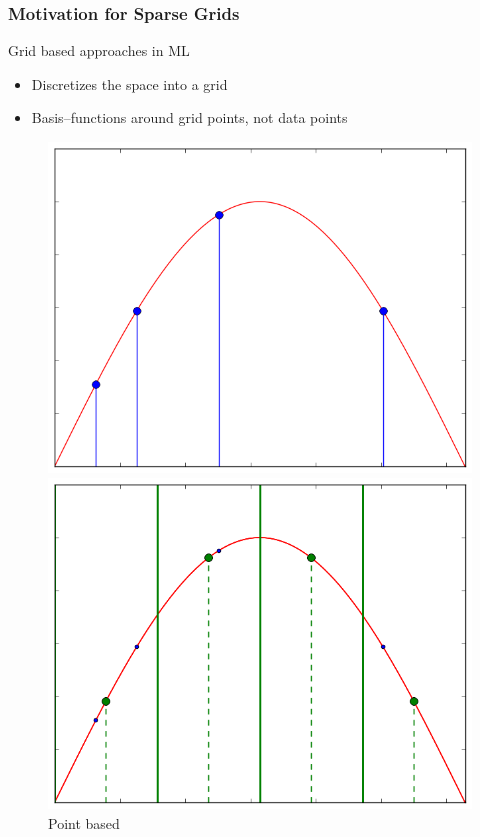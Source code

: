 \begin{frame}
  \frametitle{Motivation for Sparse Grids}
  \topline
  \vspace{-10px}
  \begin{block}{Grid based approaches in ML}
    \begin{itemize}
      \item Discretizes the space into a grid
      \item Basis--functions around grid points, not data points
    \end{itemize}

    \begin{figure}[!htb]
      \includegraphics[width=\linewidth]{images/pointbase.png}
      \vspace{-12px}
      \caption{Point based}
      \endminipage
      \hspace{0.025\textwidth}
      \includegraphics[width=\linewidth]{images/gridbase.png}

\end{figure}
\end{block}
\end{frame}
